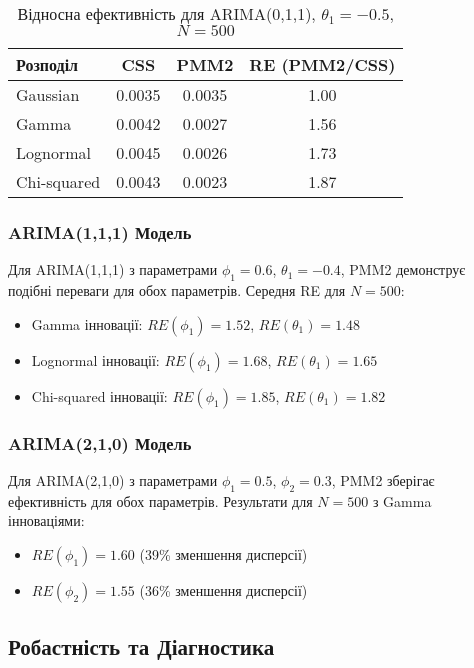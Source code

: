 \documentclass[12pt,a4paper]{article}
\begin{document}
	\begin{table}[h]
		\centering
		\caption{Відносна ефективність для ARIMA(0,1,1), $\theta_1 = -0.5$, $N = 500$}
		\label{tab:arima011_summary}
		\begin{tabular}{@{}lccc@{}}
			\toprule
			\textbf{Розподіл} & \textbf{CSS} & \textbf{PMM2} & \textbf{RE (PMM2/CSS)} \\
			\midrule
			Gaussian    & 0.0035 & 0.0035 & 1.00 \\
			Gamma       & 0.0042 & 0.0027 & 1.56 \\
			Lognormal   & 0.0045 & 0.0026 & 1.73 \\
			Chi-squared & 0.0043 & 0.0023 & 1.87 \\
			\bottomrule
		\end{tabular}
	\end{table}
	
	\subsubsection{ARIMA(1,1,1) Модель}
	
	Для ARIMA(1,1,1) з параметрами $\phi_1 = 0.6$, $\theta_1 = -0.4$, PMM2 демонструє подібні переваги для обох параметрів. Середня RE для $N = 500$:
	
	\begin{itemize}
		\item Gamma інновації: $RE(\phi_1) = 1.52$, $RE(\theta_1) = 1.48$
		\item Lognormal інновації: $RE(\phi_1) = 1.68$, $RE(\theta_1) = 1.65$
		\item Chi-squared інновації: $RE(\phi_1) = 1.85$, $RE(\theta_1) = 1.82$
	\end{itemize}
	
	\subsubsection{ARIMA(2,1,0) Модель}
	
	Для ARIMA(2,1,0) з параметрами $\phi_1 = 0.5$, $\phi_2 = 0.3$, PMM2 зберігає ефективність для обох параметрів. Результати для $N = 500$ з Gamma інноваціями:
	
	\begin{itemize}
		\item $RE(\phi_1) = 1.60$ (39\% зменшення дисперсії)
		\item $RE(\phi_2) = 1.55$ (36\% зменшення дисперсії)
	\end{itemize}
	
	\subsection{Робастність та Діагностика}
	\label{subsec:robustness}
	
\end{document}

